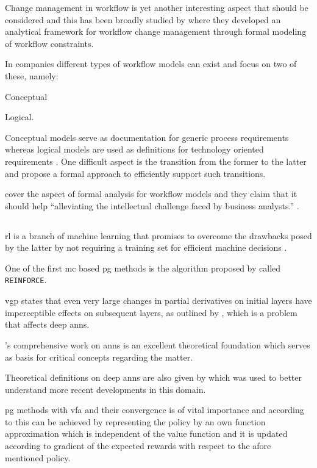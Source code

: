 \documentclass[draft=false]{seal_thesis}
\begin{document}
Change management in workflow is yet another interesting aspect that should be considered and this has been broadly studied by \citet{Wang2011} where they developed an analytical framework for workflow change management through formal modeling of workflow constraints.

In companies different types of workflow models can exist and \citet{Fan2012} focus on two of these, namely:
\begin{enumerate*}
	\item Conceptual
	\item Logical.
\end{enumerate*}

Conceptual models serve as documentation for generic process requirements whereas logical models are used as definitions for technology oriented requirements \citep{Fan2012}. One difficult aspect is the transition from the former to the latter and \citet{Fan2012} propose a formal approach to efficiently support such transitions.

\citet{Sun2013} cover the aspect of formal analysis for workflow models and they claim that it should help ``alleviating the intellectual challenge faced by business analysts.'' \citep[p. 2]{Sun2013}.

\subsection{}

\gls{rl} is a branch of machine learning that promises to overcome the drawbacks posed by the latter by not requiring a training set for efficient machine decisions \citep{Sutton2017}.

One of the first \gls{mc} based \gls{pg} methods is the algorithm proposed by \citet{Williams1992} called \texttt{REINFORCE}.

\gls{vgp} states that even very large changes in partial derivatives on initial layers have imperceptible effects on subsequent layers, as outlined by \citet{Bengio1994}, which is a problem that affects deep \glspl{ann}.

\citet{Haykin1998}'s comprehensive work on \glspl{ann} is an excellent theoretical foundation which serves as basis for critical concepts regarding the matter.

Theoretical definitions on deep \glspl{ann} are also given by \citet{Lecun1998} which was used to better understand more recent developments in this domain.

\gls{pg} methods with \gls{vfa} and their convergence is of vital importance and according to \citet{Sutton1999} this can be achieved by representing the policy by an own function approximation which is independent of the value function and it is updated according to gradient of the expected rewards with respect to the afore mentioned policy.
\end{document}
